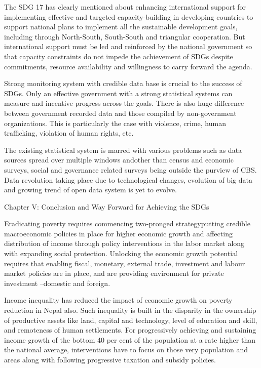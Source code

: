 \documentclass[
  openany]{book}
\begin{document}
The SDG 17 has clearly mentioned about enhancing international support for implementing effective and targeted capacity-building in developing countries to support national plans to implement all the sustainable development goals, including through North-South, South-South and triangular cooperation. But international support must be led and reinforced by the national government so that capacity constraints do not impede the achievement of SDGs despite commitments, resource availability and willingness to carry forward the agenda.

Strong monitoring system with credible data base is crucial to the success of SDGs. Only an effective government with a strong statistical systems can measure and incentive progress across the goals. There is also huge difference between government recorded data and those compiled by non-government organizations. This is particularly the case with violence, crime, human trafficking, violation of human rights, etc.

The existing statistical system is marred with various problems such as data sources spread over multiple windows andother than census and economic surveys, social and governance related surveys being outside the purview of CBS. Data revolution taking place due to technological changes, evolution of big data and growing trend of open data system is yet to evolve.

Chapter V: Conclusion and Way Forward for Achieving the SDGs

Eradicating poverty requires commencing two-pronged strategyputting credible macroeconomic policies in place for higher economic growth and affecting distribution of income through policy interventions in the labor market along with expanding social protection. Unlocking the economic growth potential requires that enabling fiscal, monetary, external trade, investment and labour market policies are in place, and are providing environment for private investment --domestic and foreign.

Income inequality has reduced the impact of economic growth on poverty reduction in Nepal also. Such inequality is built in the disparity in the ownership of productive assets like land, capital and technology, level of education and skill, and remoteness of human settlements. For progressively achieving and sustaining income growth of the bottom 40 per cent of the population at a rate higher than the national average, interventions have to focus on those very population and areas along with following progressive taxation and subsidy policies.
\end{document}

